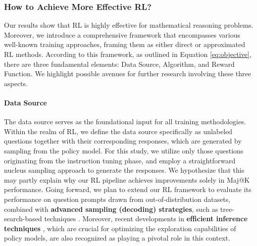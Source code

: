 \begin{itemize}[topsep=0pt]
\begin{itemize}[topsep=0pt]
\subsubsection{How to Achieve More Effective RL?}
\label{sec:effec_rl}
Our results show that RL is highly effective for mathematical reasoning problems. Moreover, we introduce a comprehensive framework that encompasses various well-known training approaches, framing them as either direct or approximated RL methods. According to this framework, as outlined in Equation \ref{eq:objective}, there are three fundamental elements: Data Source, Algorithm, and Reward Function. We highlight possible avenues for further research involving these three aspects.

\paragraph{Data Source} The data source serves as the foundational input for all training methodologies. Within the realm of RL, we define the data source specifically as unlabeled questions together with their corresponding responses, which are generated by sampling from the policy model. For this study, we utilize only those questions originating from the instruction tuning phase, and employ a straightforward nucleus sampling approach to generate the responses. We hypothesize that this may partly explain why our RL pipeline achieves improvements solely in Maj@K performance. Going forward, we plan to extend our RL framework to evaluate its performance on question prompts drawn from out-of-distribution datasets, combined with \textbf{advanced sampling (decoding) strategies}, such as tree-search-based techniques \citep{yao2023tree}. Moreover, recent developments in \textbf{efficient inference techniques} \citep{xia-etal-2023-speculative,leviathan2023fast,kwon2023efficient,xia2024unlocking}, which are crucial for optimizing the exploration capabilities of policy models, are also recognized as playing a pivotal role in this context.


\end{itemize}
\end{itemize}

